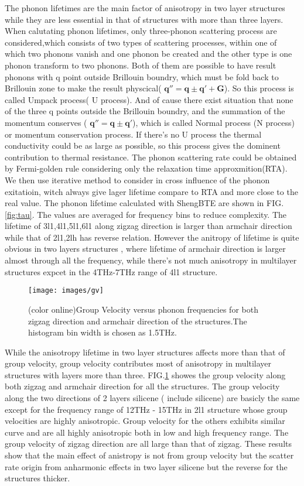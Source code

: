 \documentclass[%
 reprint,
 amsmath,amssymb,
 aps,
 prb,
]{revtex4-1}
\begin{document}
The phonon lifetimes are the main factor of anisotropy in two layer structures while they are less essential in that of structures with more than three layers. When calutating phonon lifetimes, only three-phonon scattering process are considered,which consists of two types of scattering processes, within one of which  two phonons vanish and one phonon be created and the other type is one phonon transform to two phonons. Both of them are possible to have result phonons with q point outside Brillouin boundry, which must be fold back to Brillouin zone to make the result physcical( $\mathbf{q''}=\mathbf{q} \pm \mathbf{q'}+\mathbf{G}$). So this process is called Umpack process( U process). And of cause there exist  situation that none of the three q points outside the Brillouin boundry, and the summation of the momentum conserves ( $\mathbf{q''}=\mathbf{q} \pm \mathbf{q'}$), which is called Normal process (N process) or momentum conservation process. If there's no U process the thermal conductivity could be as large as possible, so this process gives the dominent contribution to thermal resistance. The phonon scattering rate could be obtained by Fermi-golden rule\cite{Li2014} considering only the relaxation time approxmition(RTA). We then use iterative method to consider in cross influence of the phonon exitatioin, witch always give lager lifetime compare to RTA and more close to the real value. The phonon lifetime calculated with ShengBTE\cite{Li2014} are shown in FIG.\ref{fig:tau}. The values are averaged for frequency bins to reduce complexity. The lifetime of 3l1,4l1,5l1,6l1 along zigzag direction is larger than armchair direction while that of 2l1,2lh has reverse relation. However the anitropy of lifetime  is quite obvious in two layers structures , where lifetime of armchair direction is larger almost through all the frequency, while there's not much anisotropy in multilayer structures expcet in the 4THz-7THz range of 4l1 structure.

\begin{figure}[b]
  \texttt{[image: images/gv]}{}
  \caption{\label{fig:gv} (color online)Group Velocity versus phonon frequencies for both zigzag direction and armchair direction of the structures.The histogram bin width is chosen as 1.5THz.}
\end{figure}

While the anisotropy lifetime in two layer structures affects more than that of group velocity, group velocity contributes most of anisotropy in multilayer structures with layers more than three.  FIG.\ref{fig:gv} showes the group velocity along both zigzag and armchair direction for all the structures. The group velocity  along the two directions of  2 layers silicene ( include silicene) are basicly the same except for the frequency range of 12THz - 15THz in 2l1 structure whose  group velocities are highly anisotropic. Group velocity for the others exhibits similar curve and are all highly anisotropic both in low and high frequency range. The group velocity of zigzag direction are all large than that of zigzag. These results  show that the main effect of anistropy is not from group velocity but the scatter rate origin from anharmonic effects in two layer silicene but the reverse for the structures thicker.
\end{document}
